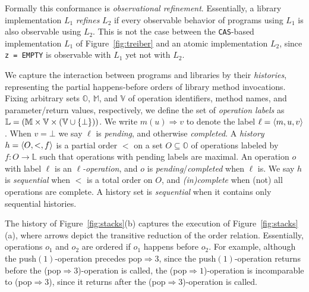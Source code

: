 Formally this conformance is \emph{observational refinement}. Essentially, a
library implementation $L_1$ \emph{refines} $L_2$ if every observable behavior
of programs using $L_1$ is also observable using $L_2$. This is not the case
between the {\tt CAS}-based implementation $L_1$ of Figure~\ref{fig:treiber}
and an atomic implementation $L_2$, since {\tt z = EMPTY} is observable with
$L_1$ yet not with $L_2$.

We capture the interaction between programs and libraries by their
\emph{histories}, representing the partial happens-before orders of library
method invocations. Fixing arbitrary sets $\mathbb{O}$, $\mathbb{M}$, and $\mathbb{V}$
of operation identifiers, method names, and parameter/return values,
respectively, we define the set of \emph{operation labels} as $\mathbb{L} =
(\mathbb{M} \times \mathbb{V} \times (\mathbb{V} \cup {\{ \bot \}}))$. We write $m(u) \Rightarrow v$ to
denote the label $\ell = {\langle{m,u,v}\rangle}$. When $v = \bot$ we say $\ell$ is
\emph{pending}, and otherwise \emph{completed}. A \emph{history} $h =
{\langle{O,<,f}\rangle}$ is a partial order $<$ on a set $O \subseteq \mathbb{O}$ of operations
labeled by $f : O \to \mathbb{L}$ such that operations with pending labels are
maximal. An operation $o$ with label $\ell$ is an \emph{$\ell$-operation}, and $o$
is \emph{pending}/\emph{completed} when $\ell$ is. We say $h$ is
\emph{sequential} when $<$ is a total order on $O$, and \emph{(in)complete}
when (not) all operations are complete. A history set is \emph{sequential} when
it contains only sequential histories.

%
%
%

\begin{example}

  The history of Figure~\ref{fig:stacks}(b) captures the execution of
  Figure~\ref{fig:stacks}(a), where arrows depict the transitive reduction of
  the order relation. Essentially, operations $o_1$ and $o_2$ are ordered if
  $o_1$ happens before $o_2$. For example, although the push$(1)$-operation
  precedes pop$\Rightarrow 3$, since the push$(1)$-operation returns before the
  (pop$\Rightarrow 3$)-operation is called, the (pop$\Rightarrow 1$)-operation
  is incomparable to (pop$\Rightarrow 3$), since it returns after the
  (pop$\Rightarrow 3$)-operation is called.

\end{example}

